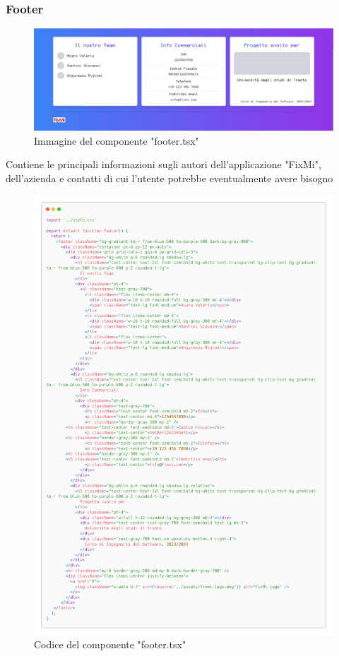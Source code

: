 \documentclass{report}
\begin{document}
\subsubsection{Footer}
\begin{figure}[H]
	\centering\includegraphics[width=1\textwidth]{images/footer.jpg}
	\caption{Immagine del componente "footer.tsx"}
\end{figure}
Contiene le principali informazioni sugli autori dell'applicazione "FixMi", dell'azienda e contatti di cui l'utente potrebbe eventualmente avere bisogno 
\begin{figure}[H]
	\centering\includegraphics[width=1\textwidth]{images/footer-carbon.png}
	\caption{Codice del componente "footer.tsx"}
\end{figure}
\end{document}
